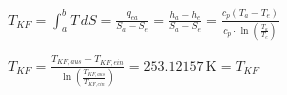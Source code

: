 \( T_{KF} = \int_{a}^{b} T \, dS = \frac{q_{ea}}{S_a - S_e} = \frac{h_a - h_e}{S_a - S_e} = \frac{c_p (T_a - T_e)}{c_p \cdot \ln \left( \frac{T_a}{T_e} \right)} \)  

\( T_{KF} = \frac{T_{KF,aus} - T_{KF,ein}}{\ln \left( \frac{T_{KF,aus}}{T_{KF,ein}} \right)} = 253.12157 \, \text{K} = T_{KF} \)